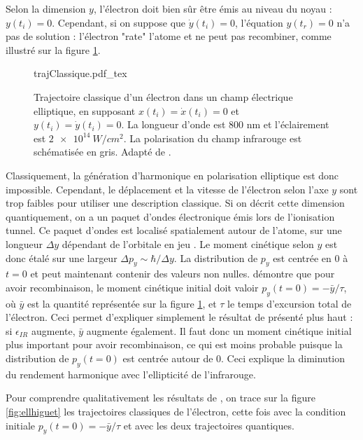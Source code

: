 Selon la dimension $y$, l'électron doit bien sûr être émis au niveau du noyau : $y(t_i) = 0$. Cependant, si on suppose que $\dot{y}(t_i) = 0$, l'équation $y(t_r) = 0$ n'a pas de solution : l'électron "rate" l'atome et ne peut pas recombiner, comme illustré sur la figure \ref{fig:ellgruson}.

\begin{figure}[!ht]
\centering
\def\svgwidth{0.7\columnwidth}
{trajClassique.pdf_tex}
\caption{Trajectoire classique d'un électron dans un champ électrique elliptique, en supposant $x(t_i) = \dot{x}(t_i) = 0$ et $y(t_i) = \dot{y}(t_i) = 0$. La longueur d'onde est 800 nm et l'éclairement est $\SI{2e14}{W/cm^2}$. La polarisation du champ infrarouge est schématisée en gris. Adapté de .}
\label{fig:ellgruson}
\end{figure}

Classiquement, la génération d'harmonique en polarisation elliptique est donc impossible. Cependant, le déplacement et la vitesse de l'électron selon l'axe $y$ sont trop faibles pour utiliser une description classique. Si on décrit cette dimension quantiquement, on a un paquet d'ondes électronique émis lors de l'ionisation tunnel. Ce paquet d'ondes est localisé spatialement autour de l'atome, sur une longueur $\Delta y$ dépendant de l'orbitale en jeu . Le moment cinétique selon $y$ est donc étalé sur une largeur $\Delta p_y\sim\hbar/\Delta y$. La distribution de $p_y$ est centrée en 0 à $t=0$ et peut maintenant contenir des valeurs non nulles.  démontre que pour avoir recombinaison, le moment cinétique initial doit valoir $p_y(t=0) = -\bar{y}/\tau$, où $\bar{y}$ est la quantité représentée sur la figure \ref{fig:ellgruson}, et $\tau$ le temps d'excursion total de l'électron. Ceci permet d'expliquer simplement le résultat de  présenté plus haut : si $\epsilon_{IR}$ augmente, $\bar{y}$ augmente également. Il faut donc un moment cinétique initial plus important pour avoir recombinaison, ce qui est moins probable puisque la distribution de $p_y(t=0)$ est centrée autour de 0. Ceci explique la diminution du rendement harmonique avec l'ellipticité de l'infrarouge.

Pour comprendre qualitativement les résultats de , on trace sur la figure \ref{fig:ellhiguet} les trajectoires classiques de l'électron, cette fois avec la condition initiale $p_y(t=0) = -\bar{y}/\tau$ et avec les deux trajectoires quantiques.

